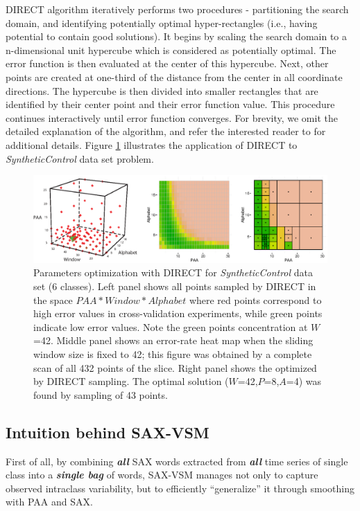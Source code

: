 DIRECT algorithm iteratively performs two procedures - partitioning the search domain, 
and identifying potentially optimal hyper-rectangles (i.e., having potential to contain good
solutions). 
It begins by scaling the search domain to a n-dimensional unit hypercube which is considered 
as potentially optimal. The error function is then evaluated at the center of this hypercube. Next, 
other points are created at one-third of the distance from the center in all coordinate directions. 
The hypercube is then divided into smaller rectangles that are identified by their center point 
and their error function value. This procedure continues interactively until error function
converges.
For brevity, we omit the detailed explanation of the algorithm, and refer the 
interested reader to \cite{citeulike:12563460} for additional details. Figure  \ref{fig:direct-sampling} 
illustrates the application of DIRECT to \textit{SyntheticControl} data set problem.

\begin{figure}[t]
   \centering
   \includegraphics[width=140mm]{figures/figure_direct.eps}
   \caption{Parameters optimization with DIRECT for \textit{SyntheticControl} data set (6 classes). 
   Left panel shows all points sampled by DIRECT in the space $PAA*Window*Alphabet$ where
   red points correspond to high error values in cross-validation experiments, 
   while green points indicate low error values. 
   Note the green points concentration at $W$=42. 
   Middle panel shows an error-rate heat map when the sliding window size is fixed to 42; 
   this figure was obtained by a complete scan of all 432 points of the slice. 
   Right panel shows the optimized by DIRECT sampling. The optimal solution 
   ($W$=42,$P$=8,$A$=4) was found by sampling of 43 points.}
   \label{fig:direct-sampling}
\end{figure}

\subsection{Intuition behind SAX-VSM}
First of all, by combining \textit{\textbf{all}} SAX words extracted from 
\textit{\textbf{all}} time series of single class into a \textit{\textbf{single bag}} of 
words, SAX-VSM manages not only to capture observed intraclass variability, 
but to efficiently ``generalize'' it through smoothing with PAA and SAX.  

